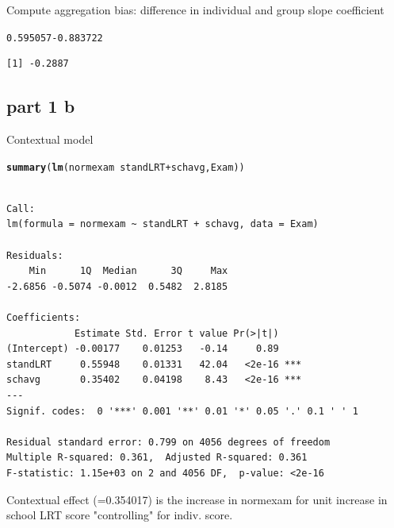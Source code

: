\documentclass{article}\usepackage{graphicx, color}
\makeatletter
\newcommand{\hlfunctioncall}[1]{\textcolor[rgb]{0.501960784313725,0,0.329411764705882}{\textbf{#1}}}%
\newenvironment{kframe}{%
 \def\at@end@of@kframe{}%
 \ifinner\ifhmode%
  \def\at@end@of@kframe{\end{minipage}}%
  \begin{minipage}{\columnwidth}%
 \fi\fi%
 \def\FrameCommand##1{\hskip\@totalleftmargin \hskip-\fboxsep
 \colorbox{shadecolor}{##1}\hskip-\fboxsep
     \hskip-\linewidth \hskip-\@totalleftmargin \hskip\columnwidth}%
 \MakeFramed {\advance\hsize-\width
   \@totalleftmargin\z@ \linewidth\hsize
   \@setminipage}}%
 {\par\unskip\endMakeFramed%
 \at@end@of@kframe}
\newenvironment{knitrout}{}{} %
\makeatother
\begin{document}
Compute aggregation bias: difference in individual and group slope coefficient
\begin{knitrout}
\color{fgcolor}\begin{kframe}
\begin{alltt}
0.595057-0.883722
\end{alltt}
\begin{verbatim}
[1] -0.2887
\end{verbatim}
\end{kframe}
\end{knitrout}


\subsection*{part 1 b}
Contextual model\\
\begin{knitrout}
\color{fgcolor}\begin{kframe}
\begin{alltt}
\hlfunctioncall{summary}(\hlfunctioncall{lm}(normexam~standLRT+schavg, Exam))
\end{alltt}
\begin{verbatim}

Call:
lm(formula = normexam ~ standLRT + schavg, data = Exam)

Residuals:
    Min      1Q  Median      3Q     Max 
-2.6856 -0.5074 -0.0012  0.5482  2.8185 

Coefficients:
            Estimate Std. Error t value Pr(>|t|)    
(Intercept) -0.00177    0.01253   -0.14     0.89    
standLRT     0.55948    0.01331   42.04   <2e-16 ***
schavg       0.35402    0.04198    8.43   <2e-16 ***
---
Signif. codes:  0 '***' 0.001 '**' 0.01 '*' 0.05 '.' 0.1 ' ' 1 

Residual standard error: 0.799 on 4056 degrees of freedom
Multiple R-squared: 0.361,	Adjusted R-squared: 0.361 
F-statistic: 1.15e+03 on 2 and 4056 DF,  p-value: <2e-16 
\end{verbatim}
\end{kframe}
\end{knitrout}

Contextual effect (=0.354017) is the increase in normexam for unit increase in school LRT score "controlling" for indiv. score.
\end{document}
